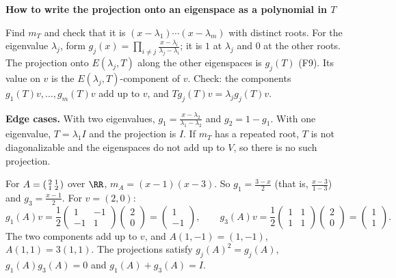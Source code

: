 \documentclass[10pt]{scrartcl}
\newenvironment{methodbox}[1]{\begin{mdframed}[style=mdbluebox,linecolor=NavyBlue,backgroundcolor=NavyBlue!3]\textbf{\color{NavyBlue}#1}\par\vspace{2pt}}{\end{mdframed}}
\begin{document}
\begin{methodbox}{How to write the projection onto an eigenspace as a polynomial in $T$}
\begin{enumerate}[label=\arabic*.,leftmargin=1.5em,itemsep=2pt,topsep=2pt]
  \ii Find $m_T$ and check that it is $(x-\lambda_1)\cdots(x-\lambda_m)$ with distinct roots.
  \ii For the eigenvalue $\lambda_j$, form $g_j(x)=\prod_{i\ne j}\frac{x-\lambda_i}{\lambda_j-\lambda_i}$; it is $1$ at $\lambda_j$ and $0$ at the other roots.
  \ii The projection onto $E(\lambda_j,T)$ along the other eigenspaces is $g_j(T)$ (F9). Its value on $v$ is the $E(\lambda_j,T)$-component of $v$.
  \ii Check: the components $g_1(T)v,\dots,g_m(T)v$ add up to $v$, and $Tg_j(T)v=\lambda_jg_j(T)v$.
\end{enumerate}
\textbf{Edge cases.} With two eigenvalues, $g_1=\frac{x-\lambda_2}{\lambda_1-\lambda_2}$ and $g_2=1-g_1$. With one eigenvalue, $T=\lambda_1I$ and the projection is $I$. If $m_T$ has a repeated root, $T$ is not diagonalizable and the eigenspaces do not add up to $V$, so there is no such projection.
\end{methodbox}

\begin{example*}
  For $A=\begin{psmallmatrix}2&1\\1&2\end{psmallmatrix}$ over $\RR$, $m_A=(x-1)(x-3)$. So $g_1=\frac{3-x}2$ (that is, $\frac{x-3}{1-3}$) and $g_3=\frac{x-1}2$. For $v=(2,0)$:
  \[ g_1(A)v=\frac12\begin{pmatrix}1&-1\\-1&1\end{pmatrix}\begin{pmatrix}2\\0\end{pmatrix}=\begin{pmatrix}1\\-1\end{pmatrix},\qquad g_3(A)v=\frac12\begin{pmatrix}1&1\\1&1\end{pmatrix}\begin{pmatrix}2\\0\end{pmatrix}=\begin{pmatrix}1\\1\end{pmatrix}. \]
  The two components add up to $v$, and $A(1,-1)=(1,-1)$, $A(1,1)=3(1,1)$. The projections satisfy $g_j(A)^2=g_j(A)$, $g_1(A)g_3(A)=0$ and $g_1(A)+g_3(A)=I$.
\end{example*}
\end{document}
